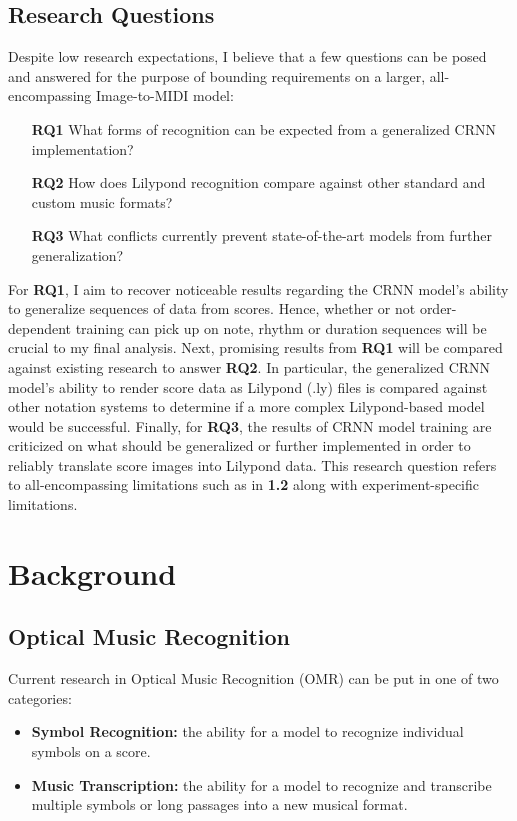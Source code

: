 \documentclass[nonacm, sigconf]{acmart}
\begin{document}
\subsection{Research Questions}

Despite low research expectations, I believe that a few questions can be posed and answered for the purpose of bounding requirements on a larger, all-encompassing Image-to-MIDI model:

\begin{itemize}
	\item [\textbf{RQ1}] What forms of recognition can be expected from a generalized CRNN implementation?
	\item [\textbf{RQ2}] How does Lilypond recognition compare against other standard and custom music formats?
	\item [\textbf{RQ3}] What conflicts currently prevent state-of-the-art models from further generalization?
\end{itemize}

For \textbf{RQ1}, I aim to recover noticeable results regarding the CRNN model's ability to generalize sequences of data from scores.
Hence, whether or not order-dependent training can pick up on note, rhythm or duration sequences will be crucial to my final analysis.
Next, promising results from \textbf{RQ1} will be compared against existing research to answer \textbf{RQ2}. 
In particular, the generalized CRNN model's ability to render score data as Lilypond (.ly) files is compared against other notation systems to determine if a more complex Lilypond-based model would be successful.
Finally, for \textbf{RQ3}, the results of CRNN model training are criticized on what should be generalized or further implemented in order to reliably translate score images into Lilypond data.
This research question refers to all-encompassing limitations such as in \textbf{1.2} along with experiment-specific limitations.

\section{Background}
\subsection{Optical Music Recognition}
Current research in Optical Music Recognition (OMR) can be put in one of two categories:

\begin{itemize}
	\item \textbf{Symbol Recognition:} the ability for a model to recognize individual symbols on a score.
	\item \textbf{Music Transcription:} the ability for a model to recognize and transcribe multiple symbols or long passages into a new musical format.
\end{itemize}
\end{document}
